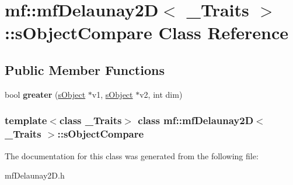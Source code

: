 \hypertarget{classmf_1_1mfDelaunay2D_1_1sObjectCompare}{
\section{mf::mfDelaunay2D$<$ \_\-Traits $>$::sObjectCompare Class Reference}
\label{classmf_1_1mfDelaunay2D_1_1sObjectCompare}
}
\subsection*{Public Member Functions}
\begin{DoxyCompactItemize}
\item 
\hypertarget{classmf_1_1mfDelaunay2D_1_1sObjectCompare_ae04c997519cf31450226f0bcc8f41359}{
bool {\bfseries greater} (\hyperlink{classmf_1_1mfDelaunay2D_1_1sObject}{sObject} $\ast$v1, \hyperlink{classmf_1_1mfDelaunay2D_1_1sObject}{sObject} $\ast$v2, int dim)}
\label{classmf_1_1mfDelaunay2D_1_1sObjectCompare_ae04c997519cf31450226f0bcc8f41359}

\end{DoxyCompactItemize}
\subsubsection*{template$<$class \_\-Traits$>$ class mf::mfDelaunay2D$<$ \_\-Traits $>$::sObjectCompare}



The documentation for this class was generated from the following file:\begin{DoxyCompactItemize}
\item 
mfDelaunay2D.h\end{DoxyCompactItemize}
